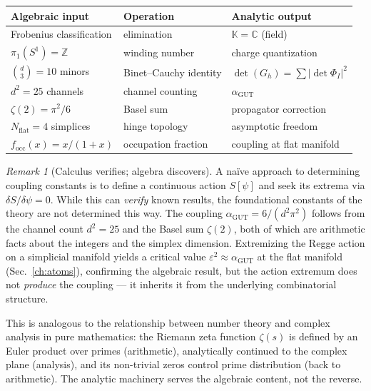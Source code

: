 \documentclass[12pt]{article}
\theoremstyle{remark}
\newtheorem{remark}[theorem]{Remark}
\theoremstyle{definition}
\begin{document}
\begin{center}
\begin{tabular}{lll}
\toprule
\textbf{Algebraic input} & \textbf{Operation} & \textbf{Analytic output} \\
\midrule
Frobenius classification & elimination & $\mathbb{K} = \mathbb{C}$ (field) \\
$\pi_1(S^1) = \mathbb{Z}$ & winding number & charge quantization \\
$\binom{d}{3} = 10$ minors & Binet--Cauchy identity & $\det(G_h) = \sum|\det \Phi_I|^2$ \\
$d^2 = 25$ channels & channel counting & $\alpha_{\mathrm{GUT}}$ \\
$\zeta(2) = \pi^2/6$ & Basel sum & propagator correction \\
$N_{\mathrm{flat}} = 4$ simplices & hinge topology & asymptotic freedom \\
$f_{\mathrm{occ}}(x) = x/(1+x)$ & occupation fraction & coupling at flat manifold \\
\bottomrule
\end{tabular}
\end{center}

\begin{remark}[Calculus verifies; algebra discovers]
A na\"ive approach to determining coupling constants is to define a continuous action $S[\psi]$ and seek its extrema via $\delta S/\delta\psi = 0$. While this can \emph{verify} known results, the foundational constants of the theory are not determined this way. The coupling $\alpha_{\mathrm{GUT}} = 6/(d^2\pi^2)$ follows from the channel count $d^2 = 25$ and the Basel sum $\zeta(2)$, both of which are arithmetic facts about the integers and the simplex dimension. Extremizing the Regge action on a simplicial manifold yields a critical value $\varepsilon^2 \approx \alpha_{\mathrm{GUT}}$ at the flat manifold (Sec.~\ref{ch:atoms}), confirming the algebraic result, but the action extremum does not \emph{produce} the coupling --- it inherits it from the underlying combinatorial structure.

This is analogous to the relationship between number theory and complex analysis in pure mathematics: the Riemann zeta function $\zeta(s)$ is defined by an Euler product over primes (arithmetic), analytically continued to the complex plane (analysis), and its non-trivial zeros control prime distribution (back to arithmetic). The analytic machinery serves the algebraic content, not the reverse.
\end{remark}
\end{document}
